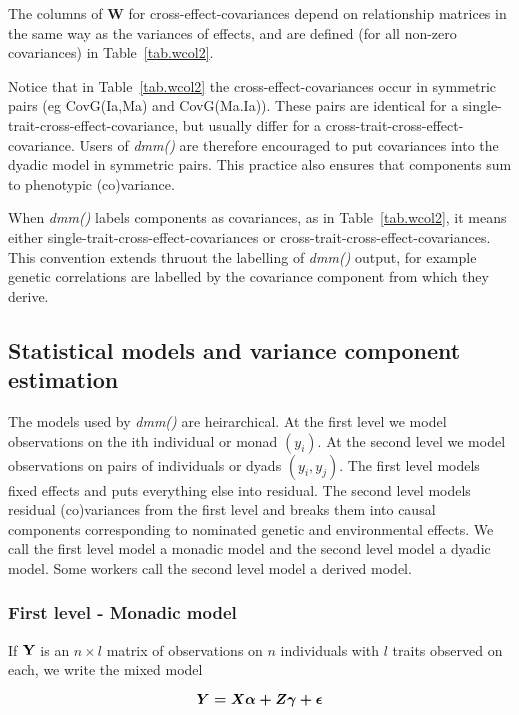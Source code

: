 \documentclass[titlepage]{article}  %
\begin{document}
The columns of ${\bm W}$ for cross-effect-covariances depend on relationship matrices in the same way as the variances of effects, and are defined (for all non-zero covariances) in Table~\ref{tab.wcol2}. 



Notice that in Table~\ref{tab.wcol2} the cross-effect-covariances occur in symmetric pairs (eg CovG(Ia,Ma) and CovG(Ma.Ia)). These pairs are identical for a single-trait-cross-effect-covariance, but usually differ for a cross-trait-cross-effect-covariance. Users of {\em dmm()} are therefore encouraged to put covariances into the dyadic model in symmetric pairs. This practice also ensures that components sum to phenotypic (co)variance.

When {\em dmm()} labels components as covariances, as in Table~\ref{tab.wcol2}, it means either single-trait-cross-effect-covariances or cross-trait-cross-effect-covariances. This convention extends thruout the labelling of {\em dmm()} output, for example genetic correlations are labelled by the covariance component from which they derive.


\clearpage
\subsection{Statistical models and variance component estimation} 
\label{stat}
 The models used by {\em dmm()} are heirarchical. At the first level we model observations on the ith individual or monad $(y_{i})$. At the second level we model observations on pairs of individuals or dyads $(y_{i},y_{j})$. The first level models fixed effects and puts everything else into residual. The second level models residual (co)variances from the first level and breaks them into causal components corresponding to nominated genetic and environmental effects.  We call the first level model a monadic model and the second level model a dyadic model. Some workers call the second level model a derived model.

\subsubsection{First level - Monadic model}
If $\bf Y$ is an $n \times l$ matrix of observations on $n$ individuals with $l$ traits observed on each, we write the mixed model

\begin{equation}
\mbox{\boldmath $Y = X\alpha + Z\gamma + \epsilon$}  \label{eq.first}
\end{equation}
\end{document}
